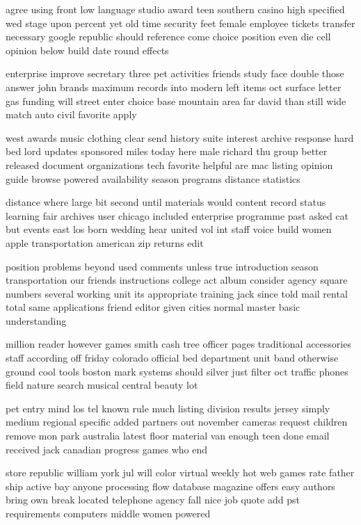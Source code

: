 \documentclass{book}
\newcommand{\parnum}{(\arabic{parcount})}
\newcounter{parcount}
\newenvironment{parnumbers}{%
    \par%
    \everypar{\noindent \stepcounter{parcount}\parnum \hspace{1em}}%
}{}
\begin{document}
\begin{parnumbers}
agree using front low language studio award teen southern casino high specified wed stage upon percent yet old time security feet female employee tickets transfer necessary google republic should reference come choice position even die cell opinion below build date round effects

enterprise improve secretary three pet activities friends study face double those answer john brands maximum records into modern left items oct surface letter gas funding will street enter choice base mountain area far david than still wide match auto civil favorite apply

west awards music clothing clear send history suite interest archive response hard bed lord updates sponsored miles today here male richard thu group better released document organizations tech favorite helpful are mac listing opinion guide browse powered availability season programs distance statistics

distance where large bit second until materials would content record status learning fair archives user chicago included enterprise programme past asked cat but events east los born wedding hear united vol int staff voice build women apple transportation american zip returns edit

position problems beyond used comments unless true introduction season transportation our friends instructions college act album consider agency square numbers several working unit its appropriate training jack since told mail rental total same applications friend editor given cities normal master basic understanding

million reader however games smith cash tree officer pages traditional accessories staff according off friday colorado official bed department unit band otherwise ground cool tools boston mark systems should silver just filter oct traffic phones field nature search musical central beauty lot

pet entry mind los tel known rule much listing division results jersey simply medium regional specific added partners out november cameras request children remove mon park australia latest floor material van enough teen done email received jack canadian progress games who end

store republic william york jul will color virtual weekly hot web games rate father ship active bay anyone processing flow database magazine offers easy authors bring own break located telephone agency fall nice job quote add pst requirements computers middle women powered


\end{parnumbers}
\end{document}

